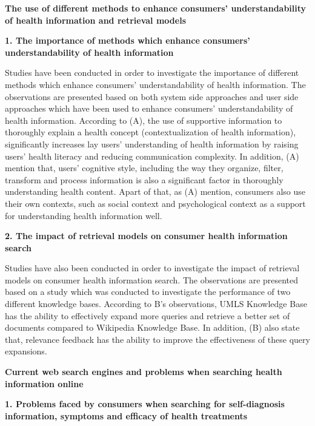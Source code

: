 \documentclass[]{article}
\begin{document}
\textbf{The use of different methods to enhance consumers' understandability of health information and retrieval models}


\textbf{1. The importance of methods which enhance consumers' understandability of health information}

Studies have been conducted in order to investigate the importance of different methods which enhance consumers' understandability of health information. The observations are presented based on both system side approaches and user side approaches which have been used to enhance consumers' understandability of health information. According to (A), the use of supportive information to thoroughly explain a health concept (contextualization of health information), significantly increases lay users' understanding of health information by raising users' health literacy and reducing communication complexity. In addition, (A) mention that, users' cognitive style, including the way they organize, filter, transform and process information is also a significant factor in thoroughly understanding health content. Apart of that, as (A) mention, consumers also use their own contexts, such as social context and psychological context as a support for understanding health information well.        


\textbf{2. The impact of retrieval models on consumer health information search} 


Studies have also been conducted in order to investigate the impact of retrieval models on consumer health information search. The observations are presented based on a study which was conducted to investigate the performance of two different knowledge bases. According to B's observations, UMLS Knowledge Base has the ability to effectively expand more queries and retrieve a better set of documents compared to Wikipedia Knowledge Base. In addition, (B) also state that, relevance feedback has the ability to improve the effectiveness of these query expansions.    
	
\textbf{Current web search engines and problems when searching health information online}

\textbf{1. Problems faced by consumers when searching for self-diagnosis information, symptoms and efficacy of health treatments}
\end{document}
